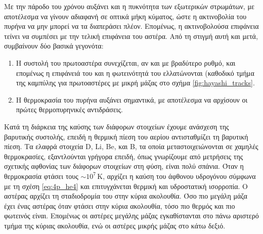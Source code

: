 Με την πάροδο του χρόνου αυξάνει και η πυκνότητα των εξωτερικών στρωμάτων, με αποτέλεσμα να γίνουν αδιαφανή σε οπτικά μήκη κύματος, ώστε η ακτινοβολία του πυρήνα να μην μπορεί να τα διαπεράσει πλέον. Επομένως, η ακτινοβολούσα επιφάνεια τείνει να συμπέσει με την τελική επιφάνεια του αστέρα. Από τη στιγμή αυτή και μετά, συμβαίνουν δύο βασικά γεγονότα:
\begin{enumerate}
    \item Η συστολή του πρωτοαστέρα συνεχίζεται, αν και με βραδύτερο ρυθμό, και επομένως η επιφάνειά του και η φωτεινότητά του ελλατώνονται (καθοδικό τμήμα της καμπύλης για πρωτοαστέρες με μικρή μάζας στο σχήμα \ref{fig:hayashi_tracks}.
    \item Η θερμοκρασία του πυρήνα αυξάνει σημαντικά, με αποτέλεσμα να αρχίσουν οι πρώτες θερμοπυρηνικές αντιδράσεις.
\end{enumerate}

Κατά τη διάρκεια της καύσης των διάφορων στοιχείων έχουμε ανάσχεση της βαρυτικής συστολής, επειδή η θερμική πίεση του αερίου αντισταθμίζει τη βαρυτική πίεση. Τα ελαφρά στοιχεία D, Li, Be, και B, τα οποία μεταστοιχειώνονται σε χαμηλές θερμοκρασίες, εξαντλούνται γρήγορα επειδή, όπως γνωρίζουμε από μετρήσεις της σχετικής αφθονίας των διάφορων στοιχείων στη φύση, είναι πολύ σπάνια. Όταν η θερμοκρασία φτάσει τους $\sim 10^7 \,\text{K}$, αρχίζει η καύση του άφθονου υδρογόνου σύμφωνα με τη σχέση \eqref{eq:4p_he4} και επιτυγχάνεται θερμική και υδροστατική ισορροπία. Ο αστέρας αρχίζει τη σταδιοδρομία του στην κύρια ακολουθία. Όσο πιο μεγάλη μάζα έχει ένας αστέρας όταν φτάσει στην κύρια ακολουθία, τόσο πιο θερμός και πιο φωτεινός είναι. Επομένως οι αστέρες μεγάλης μάζας εγκαθίστανται στο πάνω αριστερό τμήμα της κύριας ακολουθία, ενώ οι αστέρες μικρής μάζας στο κάτω δεξιό.

